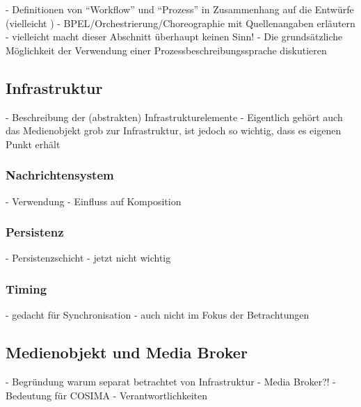   - Definitionen von "`Workflow"' und "`Prozess"' in Zusammenhang auf die Entwürfe (vielleicht )
  - BPEL/Orchestrierung/Choreographie mit Quellenangaben erläutern
  - vielleicht macht dieser Abschnitt überhaupt keinen Sinn!
  - Die grundsätzliche Möglichkeit der Verwendung einer Prozessbeschreibungssprache diskutieren


\subsection{Infrastruktur} %
\label{sub:infrastruktur}

  - Beschreibung der (abstrakten) Infrastrukturelemente
  - Eigentlich gehört auch das Medienobjekt grob zur Infrastruktur, ist jedoch so wichtig, dass es eigenen Punkt erhält

\subsubsection{Nachrichtensystem} %
\label{ssub:nachrichtensystem}

  - Verwendung
  - Einfluss auf Komposition


\subsubsection{Persistenz} %
\label{ssub:persistenz}

  - Persistenzschicht
  - jetzt nicht wichtig


\subsubsection{Timing} %
\label{ssub:timing}

  - gedacht für Synchronisation
  - auch nicht im Fokus der Betrachtungen



\subsection{Medienobjekt und Media Broker} %
\label{sub:medienobjekt}

  - Begründung warum separat betrachtet von Infrastruktur
  - Media Broker?!
  - Bedeutung für COSIMA
  - Verantwortlichkeiten

